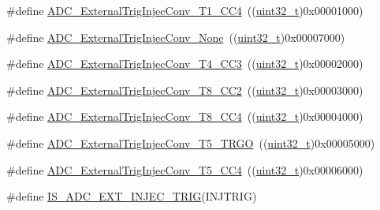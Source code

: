 \begin{DoxyCompactItemize}
\item 
\#define \hyperlink{group___a_d_c__external__trigger__sources__for__injected__channels__conversion_gabd27bcc6ff5af6713a124b3801759bcf}{A\+D\+C\+\_\+\+External\+Trig\+Injec\+Conv\+\_\+\+T1\+\_\+\+C\+C4}~((\hyperlink{_p_e___types_8h_a33594304e786b158f3fb30289278f5af}{uint32\+\_\+t})0x00001000)
\item 
\#define \hyperlink{group___a_d_c__external__trigger__sources__for__injected__channels__conversion_gaad11a68fca76d97b97dc2554dac5cb16}{A\+D\+C\+\_\+\+External\+Trig\+Injec\+Conv\+\_\+\+None}~((\hyperlink{_p_e___types_8h_a33594304e786b158f3fb30289278f5af}{uint32\+\_\+t})0x00007000)
\item 
\#define \hyperlink{group___a_d_c__external__trigger__sources__for__injected__channels__conversion_gae342ca48595f0b2bf866943969026581}{A\+D\+C\+\_\+\+External\+Trig\+Injec\+Conv\+\_\+\+T4\+\_\+\+C\+C3}~((\hyperlink{_p_e___types_8h_a33594304e786b158f3fb30289278f5af}{uint32\+\_\+t})0x00002000)
\item 
\#define \hyperlink{group___a_d_c__external__trigger__sources__for__injected__channels__conversion_gac0320df9aa5e2d378b05f8e4dcc1616a}{A\+D\+C\+\_\+\+External\+Trig\+Injec\+Conv\+\_\+\+T8\+\_\+\+C\+C2}~((\hyperlink{_p_e___types_8h_a33594304e786b158f3fb30289278f5af}{uint32\+\_\+t})0x00003000)
\item 
\#define \hyperlink{group___a_d_c__external__trigger__sources__for__injected__channels__conversion_ga6724679fe75f87c029f268ef47841a3e}{A\+D\+C\+\_\+\+External\+Trig\+Injec\+Conv\+\_\+\+T8\+\_\+\+C\+C4}~((\hyperlink{_p_e___types_8h_a33594304e786b158f3fb30289278f5af}{uint32\+\_\+t})0x00004000)
\item 
\#define \hyperlink{group___a_d_c__external__trigger__sources__for__injected__channels__conversion_ga1d92236e9eb9f3adf69371f3f698192e}{A\+D\+C\+\_\+\+External\+Trig\+Injec\+Conv\+\_\+\+T5\+\_\+\+T\+R\+GO}~((\hyperlink{_p_e___types_8h_a33594304e786b158f3fb30289278f5af}{uint32\+\_\+t})0x00005000)
\item 
\#define \hyperlink{group___a_d_c__external__trigger__sources__for__injected__channels__conversion_gade68a960ba05714e5f0a1f11a086884e}{A\+D\+C\+\_\+\+External\+Trig\+Injec\+Conv\+\_\+\+T5\+\_\+\+C\+C4}~((\hyperlink{_p_e___types_8h_a33594304e786b158f3fb30289278f5af}{uint32\+\_\+t})0x00006000)
\item 
\#define \hyperlink{group___a_d_c__external__trigger__sources__for__injected__channels__conversion_ga3cb8cadbff46e432b5e000c3a7489a0b}{I\+S\+\_\+\+A\+D\+C\+\_\+\+E\+X\+T\+\_\+\+I\+N\+J\+E\+C\+\_\+\+T\+R\+IG}(I\+N\+J\+T\+R\+IG)

\end{DoxyCompactItemize}
